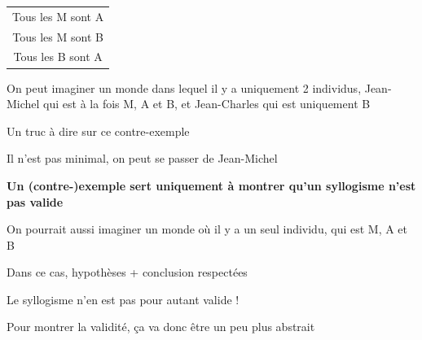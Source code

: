 \begin{frame}
	
	\begin{description}[labelindent=6pt,style=multiline,leftmargin=1.3in]
		 \setlength\itemsep{1em}

\item[Mode + figure] \begin{tabular}{c}
Tous les M sont A\\ 
Tous les M sont B\\ 
\cline{1-1}
Tous les B sont A
\end{tabular}
\item[Explication] On peut imaginer un monde dans lequel il y a uniquement 2 individus, Jean-Michel qui est à la fois M, A et B, et Jean-Charles qui est uniquement B
\item[Remarque] Un truc à dire sur ce contre-exemple \pause  \pause
\item[] Il n'est pas minimal\pause, on peut se passer de Jean-Michel

	\end{description} 
\end{frame}



\begin{frame}
	
	\begin{description}[labelindent=6pt,style=multiline,leftmargin=1.3in]
		 \setlength\itemsep{1em}
		 
\item[Remarque] \textbf{Un (contre-)exemple sert uniquement à montrer qu'un syllogisme n'est pas valide} \pause
\item[] On pourrait aussi imaginer un monde où il y a un seul individu, qui est M, A et B\pause
\item[] Dans ce cas, hypothèses + conclusion respectées\pause
\item[] Le syllogisme n'en est pas pour autant valide !
\item[] Pour montrer la validité, ça va donc être un peu plus abstrait 
	\end{description} 

	
\end{frame}

